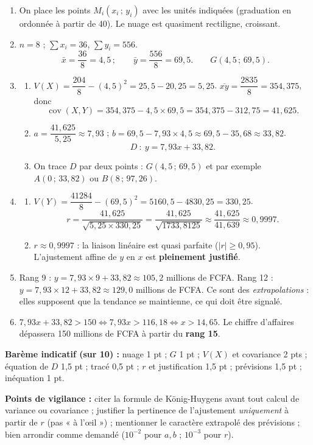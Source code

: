 \documentclass[11pt]{article}
\begin{document}
\begin{corrige}
\begin{enumerate}
\item On place les points $M_i(x_i\,;\,y_i)$ avec les unités indiquées (graduation en ordonnée à partir de 40). Le nuage est quasiment rectiligne, croissant.
\item $n=8$ ; $\displaystyle\sum x_i=36$, $\displaystyle\sum y_i=556$.
\[
\bar{x}=\frac{36}{8}=4{,}5\,;\qquad \bar{y}=\frac{556}{8}=69{,}5.\qquad G(4{,}5\,;\,69{,}5).
\]
\item \begin{enumerate}
\item $V(X)=\dfrac{204}{8}-(4{,}5)^2=25{,}5-20{,}25=5{,}25$.
$\overline{xy}=\dfrac{2835}{8}=354{,}375$, donc
\[
\operatorname{cov}(X,Y)=354{,}375-4{,}5\times69{,}5=354{,}375-312{,}75=41{,}625.
\]
\item $a=\dfrac{41{,}625}{5{,}25}\approx7{,}93$ ; $b=69{,}5-7{,}93\times4{,}5\approx69{,}5-35{,}68\approx33{,}82$.
\[
D\ :\ y=7{,}93x+33{,}82.
\]
\item On trace $D$ par deux points : $G(4{,}5\,;\,69{,}5)$ et par exemple $A(0\,;\,33{,}82)$ ou $B(8\,;\,97{,}26)$.
\end{enumerate}
\item \begin{enumerate}
\item $V(Y)=\dfrac{41284}{8}-(69{,}5)^2=5160{,}5-4830{,}25=330{,}25$.
\[
r=\frac{41{,}625}{\sqrt{5{,}25\times330{,}25}}=\frac{41{,}625}{\sqrt{1733{,}8125}}\approx\frac{41{,}625}{41{,}639}\approx0{,}9997.
\]
\item $r\approx0{,}9997$ : la liaison linéaire est quasi parfaite ($|r|\ge0{,}95$). L'ajustement affine de $y$ en $x$ est \textbf{pleinement justifié}.
\end{enumerate}
\item Rang 9 : $y=7{,}93\times9+33{,}82\approx105{,}2$ millions de FCFA.
Rang 12 : $y=7{,}93\times12+33{,}82\approx129{,}0$ millions de FCFA.
Ce sont des \emph{extrapolations} : elles supposent que la tendance se maintienne, ce qui doit être signalé.
\item $7{,}93x+33{,}82>150\iff7{,}93x>116{,}18\iff x>14{,}65$.
Le chiffre d'affaires dépassera 150 millions de FCFA à partir du \textbf{rang 15}.
\end{enumerate}
\textbf{Barème indicatif (sur 10) :} nuage 1 pt ; $G$ 1 pt ; $V(X)$ et covariance 2 pts ; équation de $D$ 1,5 pt ; tracé 0,5 pt ; $r$ et justification 1,5 pt ; prévisions 1,5 pt ; inéquation 1 pt.

\textbf{Points de vigilance :} citer la formule de König-Huygens avant tout calcul de variance ou covariance ; justifier la pertinence de l'ajustement \emph{uniquement} à partir de $r$ (pas « à l'œil ») ; mentionner le caractère extrapolé des prévisions ; bien arrondir comme demandé ($10^{-2}$ pour $a,b$ ; $10^{-3}$ pour $r$).
\end{corrige}
\end{document}
